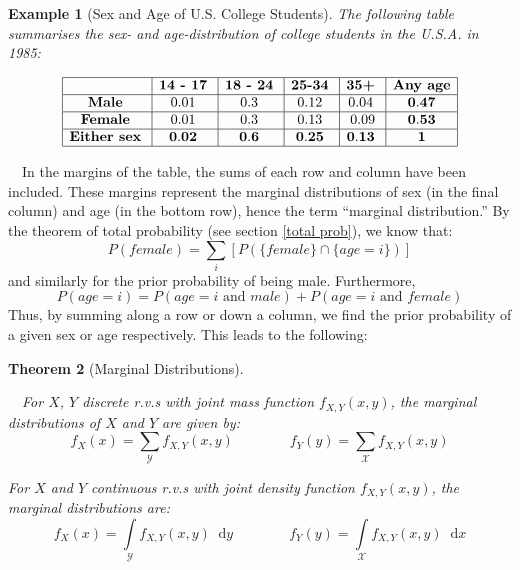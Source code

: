 \documentclass[12pt,a4paper]{article}
\newcommand{\diff}{\;\mathrm{d}}
\newtheorem{thm}{Theorem}[subsection]
\newtheorem{ex}[thm]{Example}
\begin{document}
\begin{ex}[Sex and Age of U.S. College Students]
\vspace{1cm}

The following table summarises the sex- and age-distribution of college students in the U.S.A. in 1985:

\begin{center}
$$\begin{array}{|c|c|c|c|c|c|} \hline
\quad & \textbf{14 - 17} \; & \textbf{18 - 24} \; & \textbf{25-34} \; & \textbf{35+}\; & \mbox{{\bf Any age}}\\ \hline
\text{{\bf Male}}\; & 0.01\; & 0.3\; & 0.12\; & 0.04\; & \mathbf{0.47} \\ \hline
\mbox{{\bf Female}}\; & 0.01\; & 0.3\; & 0.13\; & 0.09 & \mathbf{0.53}\\ \hline
\mbox{{\bf Either sex}}\; & \mathbf{0.02}\; & \mathbf{0.6}\; & \mathbf{0.25} \; & \mathbf{0.13}\; & \mathbf{1}\\ \hline
\end{array}$$
\end{center}

\end{ex}
$\quad$In the margins of the table, the sums of each row and column have been included. These margins represent the marginal distributions of sex (in the final column) and age (in the bottom row), hence the term ``marginal distribution.'' By the theorem of total probability (see section \ref{total prob}), we know that:
$$P(female) = \sum\limits_i [P(\{female\} \cap \{age = i\})]$$
and similarly for the prior probability of being male. Furthermore,
$$P(age = i) = P(age = i \text{ and } male) +P(age = i \text{ and } female)$$
Thus, by summing along a row or down a column, we find the prior probability of a given sex or age respectively. This leads to the following:

\begin{thm}[Marginal Distributions]$\quad$\par
\vspace{1cm}

$\quad$For $X$, $Y$ discrete r.v.s with joint mass function $f_{X,Y}(x,y)$, the marginal distributions of $X$ and $Y$ are given by:
$$f_X(x) = \sum\limits_{\mathcal{Y}} f_{X,Y}(x,y) \qquad\qquad f_Y(y) = \sum\limits_{\mathcal{X}} f_{X,Y}(x,y)$$

For $X$ and $Y$ continuous r.v.s with joint density function $f_{X,Y}(x,y)$, the marginal distributions are:
$$f_X(x) = \int\limits_{\mathcal{Y}}\!\! f_{X,Y}(x,y)\; \diff y \qquad\qquad f_Y(y) = \int\limits_{\mathcal{X}} \!\! f_{X,Y}(x,y)\; \diff x$$

\end{thm}
\end{document}
